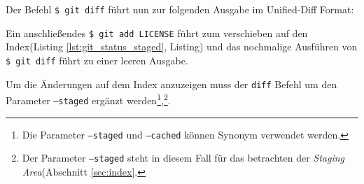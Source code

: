 

Der Befehl \texttt{\$ git diff} führt nun zur folgenden Ausgabe im Unified-Diff
Format:



Ein anschließendes \texttt{\$ git add LICENSE} führt zum verschieben auf den
Index(Listing \ref{lst:git_status_staged}, Listing) und das nochmalige
Ausführen von \texttt{\$ git diff} führt zu einer leeren Ausgabe.



Um die Änderungen auf dem Index anzuzeigen muss der \texttt{diff} Befehl um
den Parameter \texttt{--staged} ergänzt werden\footnote{Die Parameter \texttt{--staged} und
\texttt{--cached} können Synonym verwendet werden.},\footnote{Der Parameter
\texttt{--staged} steht in diesem Fall für das betrachten der \textit{Staging
Area}(Abschnitt \ref{sec:index}.}.\cite[26-29]{progit}
